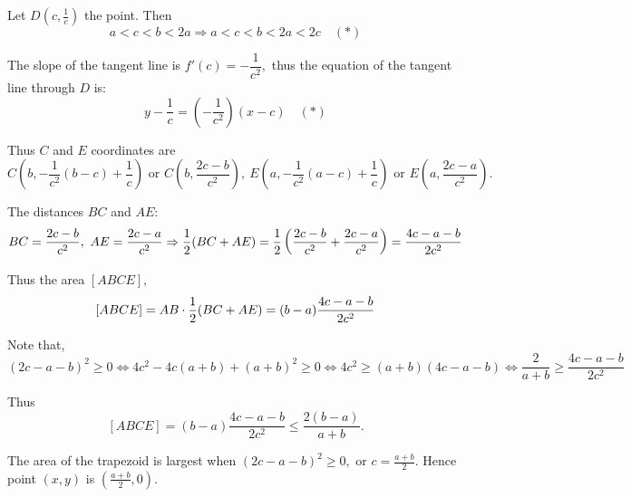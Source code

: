 \documentclass{article}
\begin{document}
\begin{soln}
    Let $D \left(c, \frac{1}{c} \right)$ the point. Then 
    \[
        a < c < b < 2a \Rightarrow a < c < b < 2a < 2c \quad (*)
    \]
    
    The slope of the tangent line is $f'(c) = -\dfrac{1}{c^2},$ thus the equation of the tangent line through $D$ is:
    \[
        y -  \frac{1}{c} = \left( -\frac{1}{c^2} \right) (x-c) \quad (*)
    \]

    Thus $C$ and $E$ coordinates are
    \[
        C \left( b, -\frac{1}{c^2}(b-c) + \frac{1}{c} \right) \text{\ or\ } C\left( b, \frac{2c - b}{c^2} \right),\ 
        E \left( a, -\frac{1}{c^2}(a-c) + \frac{1}{c} \right) \text{\ or\ } E\left( a, \frac{2c - a}{c^2} \right).
    \]

    The distances $BC$ and $AE$:
    \[
        BC = \frac{2c - b}{c^2},\ AE = \frac{2c - a}{c^2}
        \Rightarrow \frac{1}{2}(BC + AE) = \frac{1}{2} \left( \frac{2c - b}{c^2} + \frac{2c - a}{c^2} \right) = \frac{4c - a - b}{2c^2}
    \]

    Thus the area $[ABCE],$
    \[
        [ABCE] = AB \cdot \frac{1}{2}(BC + AE) = (b-a)\frac{4c - a - b}{2c^2}
    \]

    Note that,
    \[
        (2c -a -b)^2 \ge 0 \Leftrightarrow  4c^2 - 4c(a+b) + (a+b)^2 \ge 0 \Leftrightarrow 4c^2 \ge (a+b) (4c-a-b) \Leftrightarrow \frac{2}{a+b} \ge \frac{4c - a - b}{2c^2}
    \]

    Thus 
    \[
        [ABCE] = (b-a)\frac{4c - a - b}{2c^2} \le \frac{2(b-a)}{a+b}.
    \]

    The area of the trapezoid is largest when $(2c -a -b)^2 \ge 0,$ or $c = \frac{a+b}{2}.$
    Hence point $(x,y)$ is $\left(\frac{a+b}{2}, 0\right).$
\end{soln}
\end{document}
